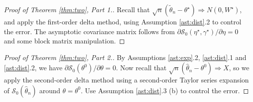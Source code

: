 \documentclass[12pt]{article}
\theoremstyle{definition}
\theoremstyle{remark}
\begin{document}
\begin{proof}[Proof of Theorem \ref{thm:two}, Part 1.]
Recall that $\sqrt{n}(\tilde{\theta}_{n} - \theta^{\star}) \Rightarrow N(0, W^{\star})$, and apply the first-order delta method, using Assumption \ref{ast:dist}.2 to control the error. The asymptotic covariance matrix follows from $\partial \mathcal{S}_0(\eta^{\star}, \gamma^{\star})/\partial \eta = 0$ and some block matrix manipulation.
\end{proof}

\begin{proof}[Proof of Theorem \ref{thm:two}, Part 2.]
By Assumptions \ref{ast:exp}.2, \ref{ast:dist}.1 and \ref{ast:dist}.2, we have $\partial \mathcal{S}_0(\theta^0) / \partial \theta = 0$. Now recall that $\sqrt{n}(\hat{\theta}_{n} - \theta^0) \Rightarrow X$, so we apply the second-order delta method using a second-order Taylor series expansion of $\mathcal{S}_0(\hat{\theta}_n)$ around $\theta = \theta^0$. Use Assumption \ref{ast:dist}.3 (b) to control the error.
\end{proof}

{
\footnotesize
{}
}
\end{document}
